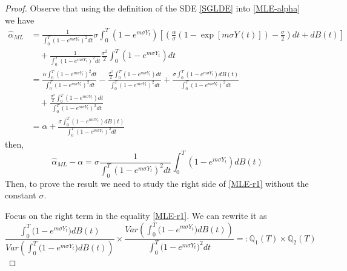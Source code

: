 \documentclass[12pt, reqno]{amsart}
\newcommand{\Q}{\mathbb Q}
\newcommand{\1}{{\bf 1}}
\newcommand{\2}{{\bf 2}}
\newcommand{\lp}{\left(}
\newcommand{\rp}{\right)}
\newcommand{\lc}{\left[}
\newcommand{\rc}{\right]}
\theoremstyle{definition}
\theoremstyle{remark}
\numberwithin{equation}{section}
\begin{document}
\begin{proof}
Observe that using the definition of the SDE \eqref{SGLDE} into \eqref{MLE-alpha} we have
\begin{align}
\hat{\alpha}_{ML} &=\frac{1}{\int_0^T(1-e^{m\sigma Y_t})^2dt}\sigma \int_0^T(1-e^{m\sigma Y_t})\lc\lp \frac{\alpha}{\sigma}\left(1-\exp \lc m\sigma Y(t)\rc \right)-\frac{\sigma}{2}\rp dt+dB(t)\rc\nonumber\\
&\quad+\frac{1}{\int_0^T(1-e^{m\sigma Y_t})^2dt}\frac{\sigma^2}{2}\int_0^T(1-e^{m\sigma Y_t})dt \nonumber\\
&=\frac{\alpha\int_0^T(1-e^{m\sigma Y_t})^2dt}{\int_0^T(1-e^{m\sigma Y_t})^2dt}-\frac{\frac{\sigma^2}{2}\int_0^T(1-e^{m\sigma Y_t})dt}{\int_0^T(1-e^{m\sigma Y_t})^2dt}+\frac{\sigma\int_0^T(1-e^{m\sigma Y_t})dB(t)}{\int_0^T(1-e^{m\sigma Y_t})^2dt}\nonumber\\
&\quad+\frac{\frac{\sigma^2}{2}\int_0^T(1-e^{m\sigma Y_t})dt}{\int_0^T(1-e^{m\sigma Y_t})^2dt}\nonumber\\
&= \alpha+\frac{\sigma\int_0^T(1-e^{m\sigma Y_t})dB(t)}{\int_0^T(1-e^{m\sigma Y_t})^2dt}
\end{align}
then, 
\begin{equation}\label{MLE-r1}
\hat{\alpha}_{ML} - \alpha = \sigma \frac{1 }{\int_0^T(1-e^{m\sigma Y_t})^2dt } \int_0^T(1-e^{m\sigma Y_t})dB(t)
\end{equation}
Then, to prove the result we need to study the right side of \eqref{MLE-r1} without the constant $\sigma$.

Focus on the right term in the equality \eqref{MLE-r1}. We can rewrite it as 
$$
\frac{\int_0^T  \big( 1-e^{m\sigma Y_t} \big)  dB(t) }{Var\left(\int_0^T  \big( 1-e^{m\sigma Y_t} \big) dB(t) \right)  } \times \frac{Var\left(\int_0^T  \big( 1-e^{m\sigma Y_t} \big) dB(t) \right)  } {\int_0^T  \big( 1-e^{m\sigma Y_t} \big)^2  dt }=: \Q_1(T) \times \Q_2(T)
$$


\end{proof}
\end{document}
